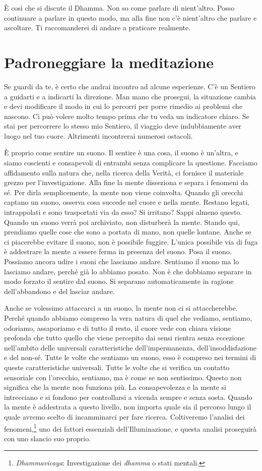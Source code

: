 È così che si discute il Dhamma. Non so come parlare di nient'altro.
Posso continuare a parlare in questo modo, ma alla fine non c'è
nient'altro che parlare e ascoltare. Ti raccomanderei di andare a
praticare realmente.

\section{Padroneggiare la meditazione}

Se guardi da te, è certo che andrai incontro ad alcune esperienze. C'è
un Sentiero a guidarti e a indicarti la direzione. Man mano che
prosegui, la situazione cambia e devi modificare il modo in cui lo
percorri per porre rimedio ai problemi che nascono. Ci può volere molto
tempo prima che tu veda un indicatore chiaro. Se stai per percorrere lo
stesso mio Sentiero, il viaggio deve indubbiamente aver luogo nel tuo
cuore. Altrimenti incontrerai numerosi ostacoli.

È proprio come sentire un suono. Il sentire è una cosa, il suono è
un'altra, e siamo coscienti e consapevoli di entrambi senza complicare
la questione. Facciamo affidamento sulla natura che, nella ricerca della
Verità, ci fornisce il materiale grezzo per l'investigazione. Alla fine
la mente disseziona e separa i fenomeni da sé. Per dirla semplicemente,
la mente non viene coinvolta. Quando gli orecchi captano un suono,
osserva cosa succede nel cuore e nella mente. Restano legati,
intrappolati e sono trasportati via da esso? Si irritano? Sappi almeno
questo. Quando un suono verrà poi archiviato, non disturberà la mente.
Stando qui, prendiamo quelle cose che sono a portata di mano, non quelle
lontane. Anche se ci piacerebbe evitare il suono, non è possibile
fuggire. L'unica possibile via di fuga è addestrare la mente a essere
ferma in presenza del suono. Posa il suono. Possiamo ancora udire i
suoni che lasciamo andare. Sentiamo il suono ma lo lasciamo andare,
perché già lo abbiamo posato. Non è che dobbiamo separare in modo
forzato il sentire dal suono. Si separano automaticamente in ragione
dell'abbandono e del lasciar andare.

Anche se volessimo attaccarci a un suono, la mente non ci si
attaccherebbe. Perché quando abbiamo compreso la vera natura di quel che
vediamo, sentiamo, odoriamo, assaporiamo e di tutto il resto, il cuore
vede con chiara visione profonda che tutto quello che viene percepito
dai sensi rientra senza eccezione nell'ambito delle universali
caratteristiche dell'impermanenza, dell'insoddisfazione e del non-sé.
Tutte le volte che sentiamo un suono, esso è compreso nei termini di
queste caratteristiche universali. Tutte le volte che si verifica un
contatto sensoriale con l'orecchio, sentiamo, ma è come se non
sentissimo. Questo non significa che la mente non funziona più. La
consapevolezza e la mente si intrecciano e si fondono per controllarsi a
vicenda sempre e senza sosta. Quando la mente è addestrata a questo
livello, non importa quale sia il percorso lungo il quale avremo scelto
di incamminarci per fare ricerca. Coltiveremo l'analisi dei
fenomeni,\footnote{\emph{Dhammavicaya}: Investigazione dei \emph{dhamma}
  o stati mentali.} uno dei fattori essenziali dell'Illuminazione, e
questa analisi proseguirà con uno slancio suo proprio.

